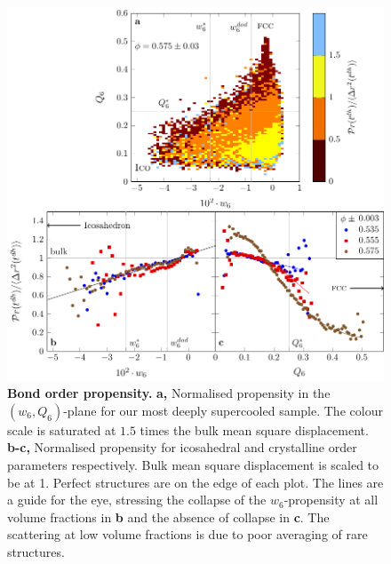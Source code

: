 \begin{figure}
\begin{center}
\includegraphics{generate_figures-figure2.pdf}
\end{center}
\caption{\textbf{Bond order propensity.} {\bf a,} Normalised propensity in the $(w_6, Q_6)$-plane for our most deeply supercooled sample. The colour scale is saturated at $1.5$ times the bulk mean square displacement. {\bf b-c,} Normalised propensity for icosahedral and crystalline order parameters respectively. Bulk mean square displacement is scaled to be at 1. Perfect structures are on the edge of each plot. The lines are a guide for the eye, stressing the collapse of the $w_6$-propensity at all volume fractions in {\bf b} and the absence of collapse in {\bf c}. The scattering at low volume fractions is due to poor averaging of rare structures.}
	\label{fig:msd_Q6_w6}
\end{figure}

\clearpage


